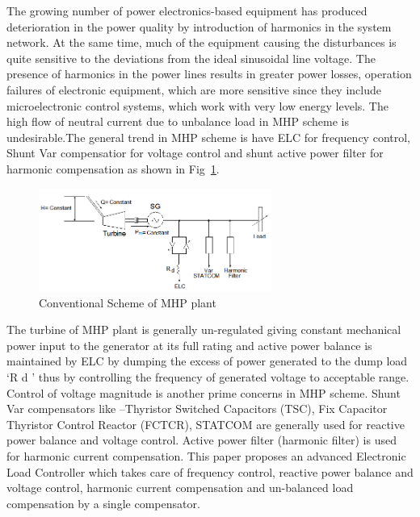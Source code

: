 \documentclass[journal,twoside]{IEEEtran}
\begin{document}
\bigskip
The growing number of power electronics-based equipment
has produced deterioration in the power quality by introduction
of harmonics in the system network. At the same time, much of
the equipment causing the disturbances is quite sensitive to the
deviations from the ideal sinusoidal line voltage.\cite{2} The
presence of harmonics in the power lines results in greater
power losses, operation failures of electronic equipment, which
are more sensitive since they include microelectronic control
systems, which work with very low energy levels. The high
flow of neutral current due to unbalance load in MHP scheme
is undesirable.The general trend in MHP scheme is have ELC
for frequency control, Shunt Var compensatior for voltage
 control and shunt active power filter for harmonic
compensation as shown in Fig~\ref{f1}. \cite{2}

\begin{figure}[!ht]
\centering
\includegraphics[width=3in]{1}
\caption{Conventional Scheme of MHP plant}
\label{f1}
\end{figure}

\bigskip
The turbine of MHP plant is generally un-regulated giving
constant mechanical power input to the generator at its full
rating and active power balance is maintained by ELC by
dumping the excess of power generated to the dump load ‘R d ’
thus by controlling the frequency of generated voltage to
acceptable range. Control of voltage magnitude is another
prime concerns in MHP scheme. Shunt Var compensators like
–Thyristor Switched Capacitors (TSC), Fix Capacitor
Thyristor Control Reactor (FCTCR), STATCOM are generally
used for reactive power balance and voltage control. Active
power filter (harmonic filter) is used for harmonic current
compensation. This paper proposes an advanced Electronic
Load Controller which takes care of frequency control,
reactive power balance and voltage control, harmonic current
compensation and un-balanced load compensation by a single
compensator.
\end{document}
